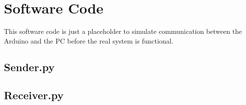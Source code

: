 \documentclass[a4paper,11pt]{article}
\begin{document}
\newpage
\appendix
\section{Software Code}
This software code is just a placeholder to simulate
communication between the Arduino and the PC
before the real system is functional.

\subsection{Sender.py}



\subsection{Receiver.py}


\end{document}
